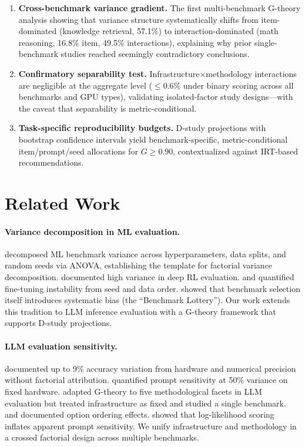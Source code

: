 \documentclass[11pt,twocolumn]{article}
\begin{document}
\begin{enumerate}
\item \textbf{Cross-benchmark variance gradient.} The first multi-benchmark G-theory analysis showing that variance structure systematically shifts from item-dominated (knowledge retrieval, 57.1\%) to interaction-dominated (math reasoning, 16.8\% item, 49.5\% interactions), explaining why prior single-benchmark studies reached seemingly contradictory conclusions.

\item \textbf{Confirmatory separability test.} Infrastructure$\times$methodology interactions are negligible at the aggregate level ($\leq$0.6\% under binary scoring across all benchmarks and GPU types), validating isolated-factor study designs---with the caveat that separability is metric-conditional.

\item \textbf{Task-specific reproducibility budgets.} D-study projections with bootstrap confidence intervals yield benchmark-specific, metric-conditional item/prompt/seed allocations for $G\geq0.90$, contextualized against IRT-based recommendations.
\end{enumerate}

\section{Related Work}

\paragraph{Variance decomposition in ML evaluation.}
\citet{bouthillier2021} decomposed ML benchmark variance across hyperparameters, data splits, and random seeds via ANOVA, establishing the template for factorial variance decomposition.
\citet{henderson2018} documented high variance in deep RL evaluation.
\citet{dodge2020} and \citet{sellam2022} quantified fine-tuning instability from seed and data order.
\citet{dehghani2021} showed that benchmark selection itself introduces systematic bias (the ``Benchmark Lottery'').
Our work extends this tradition to LLM inference evaluation with a G-theory framework that supports D-study projections.

\paragraph{LLM evaluation sensitivity.}
\citet{yuan2025} documented up to 9\% accuracy variation from hardware and numerical precision without factorial attribution.
\citet{brittlebench2026} quantified prompt sensitivity at 50\% variance on fixed hardware.
\citet{mesting2026} adapted G-theory to five methodological facets in LLM evaluation but treated infrastructure as fixed and studied a single benchmark.
\citet{lu2022} and \citet{pezeshkpour2024} documented option ordering effects.
\citet{hua2025} showed that log-likelihood scoring inflates apparent prompt sensitivity.
We unify infrastructure and methodology in a crossed factorial design across multiple benchmarks.
\end{document}
